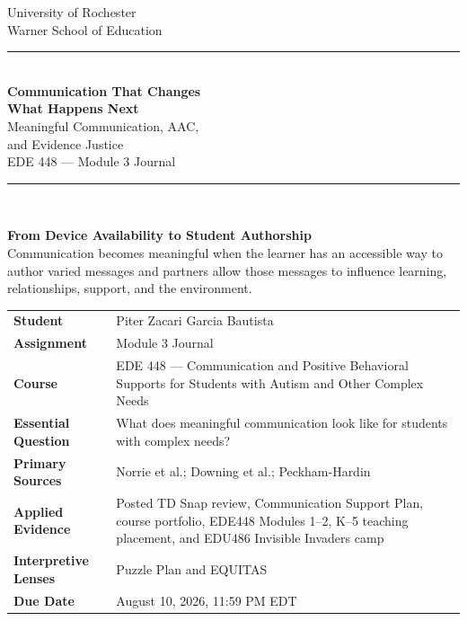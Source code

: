 \documentclass[11pt]{article}
\begin{document}
\hypersetup{pageanchor=false}
\begin{titlepage}
\thispagestyle{empty}

\begin{center}
{\large University of Rochester\\}
{\normalsize Warner School of Education\\[0.15in]}

{\color{PrimaryRed}\rule{\textwidth}{1.4pt}}\\[0.12in]
{\Huge\bfseries Communication That Changes\\[0.07in]
What Happens Next}\\[0.15in]
{\huge Meaningful Communication, AAC,\\[0.07in]
and Evidence Justice}\\[0.18in]
{\Large EDE 448 --- Module 3 Journal}\\[0.12in]

\vfill

{\color{PrimaryRed}\rule{0.78\textwidth}{0.7pt}}\\[0.20in]

\colorbox{SoftBlue}{%
\parbox{0.88\textwidth}{%
\centering\small\vspace{0.02in}
\textbf{From Device Availability to Student Authorship}\\[0.05in]
Communication becomes meaningful when the learner has an accessible way to author varied messages and partners allow those messages to influence learning, relationships, support, and the environment.
}%
}
\end{center}

\vfill

\begin{center}
\renewcommand{\arraystretch}{1.18}
\setlength{\tabcolsep}{4pt}
\begin{tabular}{>{\bfseries\RaggedLeft\arraybackslash}p{1.65in} >{\RaggedRight\arraybackslash}p{5.0in}}
Student & Piter Zacari Garcia Bautista \\
Assignment & Module 3 Journal \\
Course & EDE 448 --- Communication and Positive Behavioral Supports for Students with Autism and Other Complex Needs \\
Essential Question & What does meaningful communication look like for students with complex needs? \\
Primary Sources & Norrie et al.; Downing et al.; Peckham-Hardin \\
Applied Evidence & Posted TD Snap review, Communication Support Plan, course portfolio, EDE448 Modules 1--2, K--5 teaching placement, and EDU486 Invisible Invaders camp \\
Interpretive Lenses & Puzzle Plan and EQUITAS \\
Due Date & August 10, 2026, 11:59 PM EDT \\
\end{tabular}
\end{center}


\end{titlepage}
\end{document}
